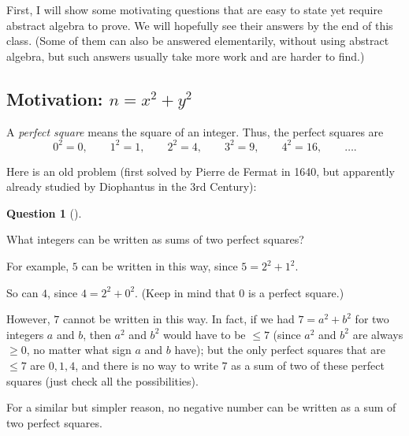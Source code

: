 \documentclass[numbers=enddot,12pt,final,onecolumn,notitlepage]{scrartcl}%
\numberwithin{exer}{subsection}
\theoremstyle{definition}
\newtheorem{quest}[theo]{Question}
\newenvironment{question}[1][]
{\begin{quest}[#1]\begin{leftbar}}
{\end{leftbar}\end{quest}}
\newenvironment{question}[1][Question]{\noindent\textbf{#1.} }{\ \rule{0.5em}{0.5em}}
\begin{document}
First, I will show some motivating questions that are easy to state yet
require abstract algebra to prove. We will hopefully see their answers by the
end of this class. (Some of them can also be answered elementarily, without
using abstract algebra, but such answers usually take more work and are harder
to find.)

\subsection{\label{subsect.intro.sum-of-2sq}Motivation: $n=x^{2}+y^{2}$}

A \textit{perfect square} means the square of an integer. Thus, the perfect
squares are
\[
0^{2} = 0, \qquad1^{2} = 1, \qquad2^{2} = 4, \qquad3^{2} = 9, \qquad4^{2} =
16, \qquad\ldots.
\]


Here is an old problem (first solved by Pierre de Fermat in 1640, but
apparently already studied by Diophantus in the 3rd Century):

\begin{question}
\label{quest.intro.sum-of-2sq.1} What integers can be written as sums of two
perfect squares?
\end{question}

For example, $5$ can be written in this way, since $5=2^{2}+1^{2}$.

So can $4$, since $4=2^{2}+0^{2}$. (Keep in mind that $0$ is a perfect square.)

However, $7$ cannot be written in this way. In fact, if we had $7 = a^{2} +
b^{2}$ for two integers $a$ and $b$, then $a^{2}$ and $b^{2}$ would have to be
$\leq7$ (since $a^{2}$ and $b^{2}$ are always $\geq0$, no matter what sign $a$
and $b$ have); but the only perfect squares that are $\leq7$ are $0,1,4$, and
there is no way to write $7$ as a sum of two of these perfect squares (just
check all the possibilities).

For a similar but simpler reason, no negative number can be written as a sum
of two perfect squares.
\end{document}
